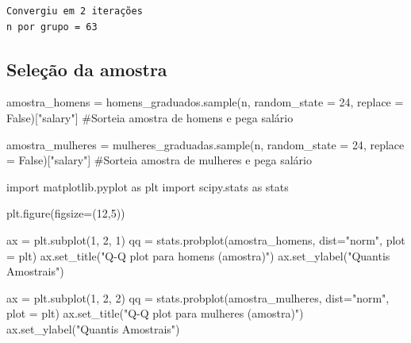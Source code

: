 \documentclass[
  letterpaper,
  DIV=11,
  numbers=noendperiod]{scrreprt}
\newenvironment{Shaded}{\begin{snugshade}}{\end{snugshade}}
\newcommand{\CommentTok}[1]{\textcolor[rgb]{0.37,0.37,0.37}{#1}}
\newcommand{\DecValTok}[1]{\textcolor[rgb]{0.68,0.00,0.00}{#1}}
\newcommand{\ImportTok}[1]{\textcolor[rgb]{0.00,0.46,0.62}{#1}}
\newcommand{\NormalTok}[1]{\textcolor[rgb]{0.00,0.23,0.31}{#1}}
\newcommand{\OperatorTok}[1]{\textcolor[rgb]{0.37,0.37,0.37}{#1}}
\newcommand{\StringTok}[1]{\textcolor[rgb]{0.13,0.47,0.30}{#1}}
\newcommand{\VariableTok}[1]{\textcolor[rgb]{0.07,0.07,0.07}{#1}}
\begin{document}
\begin{verbatim}
Convergiu em 2 iterações
n por grupo = 63
\end{verbatim}

\subsection{Seleção da amostra}\label{seleuxe7uxe3o-da-amostra}

\begin{Shaded}
\begin{Highlighting}[]
\NormalTok{amostra\_homens }\OperatorTok{=}\NormalTok{ homens\_graduados.sample(n, random\_state }\OperatorTok{=} \DecValTok{24}\NormalTok{, replace }\OperatorTok{=} \VariableTok{False}\NormalTok{)[}\StringTok{"salary"}\NormalTok{] }\CommentTok{\#Sorteia amostra de homens e pega salário}

\NormalTok{amostra\_mulheres }\OperatorTok{=}\NormalTok{ mulheres\_graduadas.sample(n, random\_state }\OperatorTok{=} \DecValTok{24}\NormalTok{, replace }\OperatorTok{=} \VariableTok{False}\NormalTok{)[}\StringTok{"salary"}\NormalTok{] }\CommentTok{\#Sorteia amostra de mulheres e pega salário}
\end{Highlighting}
\end{Shaded}

\begin{Shaded}
\begin{Highlighting}[]
\ImportTok{import}\NormalTok{ matplotlib.pyplot }\ImportTok{as}\NormalTok{ plt}
\ImportTok{import}\NormalTok{ scipy.stats }\ImportTok{as}\NormalTok{ stats}

\NormalTok{plt.figure(figsize}\OperatorTok{=}\NormalTok{(}\DecValTok{12}\NormalTok{,}\DecValTok{5}\NormalTok{))}

\NormalTok{ax }\OperatorTok{=}\NormalTok{ plt.subplot(}\DecValTok{1}\NormalTok{, }\DecValTok{2}\NormalTok{, }\DecValTok{1}\NormalTok{)}
\NormalTok{qq }\OperatorTok{=}\NormalTok{ stats.probplot(amostra\_homens, dist}\OperatorTok{=}\StringTok{"norm"}\NormalTok{, plot }\OperatorTok{=}\NormalTok{ plt)}
\NormalTok{ax.set\_title(}\StringTok{"Q{-}Q plot para homens (amostra)"}\NormalTok{)}
\NormalTok{ax.set\_ylabel(}\StringTok{"Quantis Amostrais"}\NormalTok{)}

\NormalTok{ax }\OperatorTok{=}\NormalTok{ plt.subplot(}\DecValTok{1}\NormalTok{, }\DecValTok{2}\NormalTok{, }\DecValTok{2}\NormalTok{)}
\NormalTok{qq }\OperatorTok{=}\NormalTok{ stats.probplot(amostra\_mulheres, dist}\OperatorTok{=}\StringTok{"norm"}\NormalTok{, plot }\OperatorTok{=}\NormalTok{ plt)}
\NormalTok{ax.set\_title(}\StringTok{"Q{-}Q plot para mulheres (amostra)"}\NormalTok{)}
\NormalTok{ax.set\_ylabel(}\StringTok{"Quantis Amostrais"}\NormalTok{)}
\end{Highlighting}
\end{Shaded}
\end{document}

